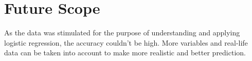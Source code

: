 \documentclass[a4paper,10pt]{article}
\begin{document}
\section{Future Scope}

As the data was stimulated for the purpose of understanding and applying logistic regression, the accuracy couldn't be high. More variables and real-life data can be taken into account to make more realistic and better prediction.



\fontsize{8}{9}\selectfont




\clearpage
\end{document}
